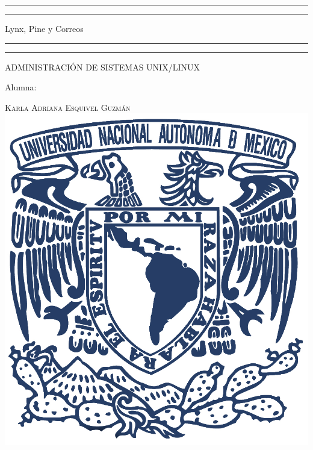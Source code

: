 \documentclass[a4paper, 11pt, oneside]{article}
\begin{document}
 

\begin{titlepage} 

	\centering 
	
	\scshape 
	
	\vspace*{\baselineskip} 
	
	
	
	\rule{\textwidth}{1.6pt}\vspace*{-\baselineskip}\vspace*{2pt} 
	\rule{\textwidth}{0.4pt} 
	
	\vspace{0.75\baselineskip} 
	
	{\LARGE Lynx, Pine y Correos}	
	\vspace{0.75\baselineskip} 
	
	\rule{\textwidth}{0.4pt}\vspace*{-\baselineskip}\vspace{3.2pt}
	\rule{\textwidth}{1.6pt} 
	
	\vspace{2\baselineskip} 
	

	ADMINISTRACIÓN DE SISTEMAS UNIX/LINUX
	
	\vspace*{3\baselineskip} 
	
	
	
	Alumna:
	
	\vspace{0.5\baselineskip} 
	
	{\scshape\Large Karla Adriana Esquivel Guzmán \\} 
	\vspace{0.5\baselineskip} 
	\vfill
	\includegraphics{unam.jpg}
	

\end{titlepage}
\end{document}
